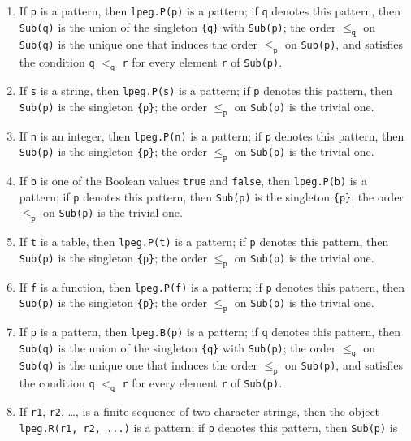 \documentclass{article}
\begin{document}
\begin{enumerate}
\item If \verb|p| is a pattern, then \verb|lpeg.P(p)| is a pattern; if
  \verb|q| denotes this pattern, then \verb|Sub(q)| is the union of
  the singleton \verb|{q}| with \verb|Sub(p)|; the order
  \(\leq_\mathtt{q}\) on \verb|Sub(q)| is the unique one that induces
  the order \(\leq_\mathtt{p}\) on \verb|Sub(p)|, and satisfies the
  condition \verb|q| \(<_\mathtt{q}\) \verb|r| for every element
  \verb|r| of \verb|Sub(p)|.
\item If \verb|s| is a string, then \verb|lpeg.P(s)| is a pattern; if
  \verb|p| denotes this pattern, then \verb|Sub(p)| is the singleton
  \verb|{p}|; the order \(\leq_\mathtt{p}\) on \verb|Sub(p)| is the
  trivial one.
\item \label{item:b8e13ne0} If \verb|n| is an integer, then
  \verb|lpeg.P(n)| is a pattern; if \verb|p| denotes this pattern,
  then \verb|Sub(p)| is the singleton \verb|{p}|; the order
  \(\leq_\mathtt{p}\) on \verb|Sub(p)| is the trivial one.
\item If \verb|b| is one of the Boolean values \verb|true| and
  \verb|false|, then \verb|lpeg.P(b)| is a pattern; if \verb|p|
  denotes this pattern, then \verb|Sub(p)| is the singleton
  \verb|{p}|; the order \(\leq_\mathtt{p}\) on \verb|Sub(p)| is the
  trivial one.
\item If \verb|t| is a table, then \verb|lpeg.P(t)| is a pattern; if
  \verb|p| denotes this pattern, then \verb|Sub(p)| is the singleton
  \verb|{p}|; the order \(\leq_\mathtt{p}\) on \verb|Sub(p)| is the
  trivial one.
\item If \verb|f| is a function, then \verb|lpeg.P(f)| is a pattern;
  if \verb|p| denotes this pattern, then \verb|Sub(p)| is the
  singleton \verb|{p}|; the order \(\leq_\mathtt{p}\) on \verb|Sub(p)|
  is the trivial one.
\item If \verb|p| is a pattern, then \verb|lpeg.B(p)| is a pattern; if
  \verb|q| denotes this pattern, then \verb|Sub(q)| is the union of
  the singleton \verb|{q}| with \verb|Sub(p)|; the order
  \(\leq_\mathtt{q}\) on \verb|Sub(q)| is the unique one that induces
  the order \(\leq_\mathtt{p}\) on \verb|Sub(p)|, and satisfies the
  condition \verb|q| \(<_\mathtt{q}\) \verb|r| for every element
  \verb|r| of \verb|Sub(p)|.
\item If \verb|r1|, \verb|r2|, \dots, is a finite sequence of
  two-character strings, then the object \verb|lpeg.R(r1, r2, ...)| is
  a pattern; if \verb|p| denotes this pattern, then \verb|Sub(p)| is

\end{enumerate}
\end{document}
